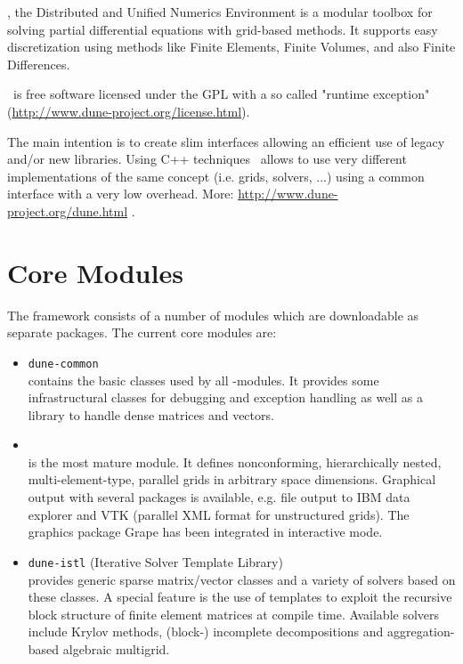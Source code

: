 \Dune, the Distributed and Unified Numerics Environment is a modular toolbox for solving partial differential equations with grid-based methods. It supports easy discretization using methods like Finite Elements, Finite Volumes, and also Finite Differences.

\Dune\ is free software licensed under the GPL with a so called "runtime exception" (\url{http://www.dune-project.org/license.html}).

The main intention is to create slim interfaces allowing an efficient use of legacy and/or new libraries. Using C++ techniques \Dune\ allows to use very different implementations of the same concept (i.e. grids, solvers, ...) using a common interface with a very low overhead. More: \url{http://www.dune-project.org/dune.html} \cite{duneweb}.



\section{Core Modules}
The framework consists of a number of modules which are downloadable as separate packages. The current core modules are:

\begin{itemize}
 \item \texttt{dune-common}\\
    contains the basic classes used by all \Dune-modules. It provides some infrastructural classes for debugging and exception
    handling as well as a library to handle dense matrices and vectors.
 \item \Grid\\
    is the most mature module. It defines nonconforming, hierarchically nested, multi-element-type, parallel grids in
    arbitrary space dimensions. Graphical output with several packages is available, e.g. file output to IBM data explorer
    and VTK (parallel XML format for unstructured grids). The graphics package Grape has been integrated in interactive mode.
 \item \texttt{dune-istl} (Iterative Solver Template Library)\\
    provides generic sparse matrix/vector classes and a variety of solvers based on these classes. A special feature is the use
    of templates to exploit the recursive block structure of finite element matrices at compile time. Available solvers include
    Krylov methods, (block-) incomplete decompositions and aggregation-based algebraic multigrid.
\end{itemize}




